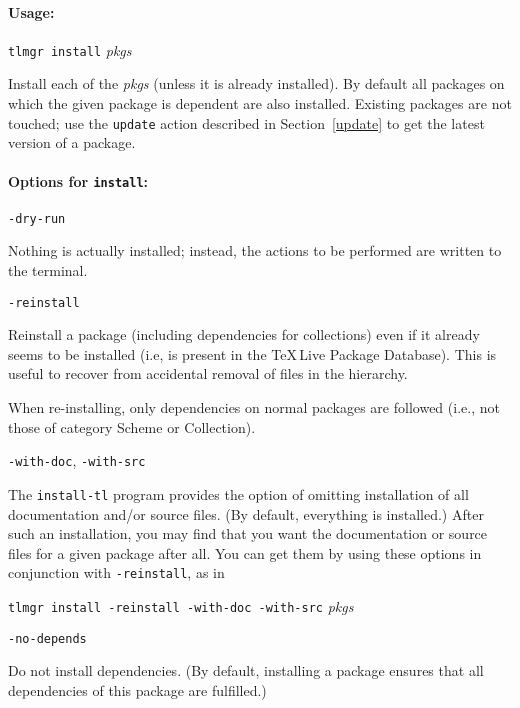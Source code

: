 \documentclass[11pt]{article}
\begin{document}
\paragraph{Usage:}
\begin{list}{}{}
\item  \texttt{tlmgr install} \textsl{pkgs}
\end{list}

Install each of the \textsl{pkgs} (unless it is already
installed). By default all packages on which the given
package is dependent are also installed. Existing packages
are not touched; use the \texttt{update} action described in
Section~\ref{update} to get the latest version of a package.


\paragraph{Options for \mdseries\texttt{install}:}

\begin{description}

\item\texttt{-dry-run}\par 

Nothing is actually installed; instead, the actions to be
performed are written to the terminal.

\item\texttt{-reinstall}\par 

Reinstall a package (including dependencies for collections)
even if it already seems to be installed (i.e, is present in
the \TeX\,Live Package Database). This is useful to recover
from accidental removal of files in the hierarchy.

When re-installing, only dependencies on normal packages are
followed (i.e., not those of category Scheme or Collection).

\item\texttt{-with-doc}, \texttt{-with-src}\par 

The \texttt{install-tl} program provides the option of
omitting installation of all documentation and/or source
files. (By default, everything is installed.) After such an
installation, you may find that you want the documentation
or source files for a given package after all. You can
get them by using these options in conjunction with
\texttt{-reinstall}, as in 
\begin{center} 
  \texttt{tlmgr install -reinstall -with-doc -with-src} \textsl{pkgs}
\end{center}

\item\texttt{-no-depends}\par 

Do not install dependencies. (By default, installing a
package ensures that all dependencies of this package are
fulfilled.)

\end{description}
\end{document}
